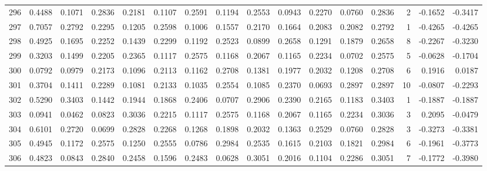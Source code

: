 \begin{tabular}{lrrrrrrrrrrrrrrr}
296 &      0.4488 &  0.1071 &  0.2836 &  0.2181 &  0.1107 &  0.2591 &  0.1194 &  0.2553 &  0.0943 &  0.2270 &   0.0760 &     0.2836 &      2 &                   -0.1652 &                    -0.3417 \\
297 &      0.7057 &  0.2792 &  0.2295 &  0.1205 &  0.2598 &  0.1006 &  0.1557 &  0.2170 &  0.1664 &  0.2083 &   0.2082 &     0.2792 &      1 &                   -0.4265 &                    -0.4265 \\
298 &      0.4925 &  0.1695 &  0.2252 &  0.1439 &  0.2299 &  0.1192 &  0.2523 &  0.0899 &  0.2658 &  0.1291 &   0.1879 &     0.2658 &      8 &                   -0.2267 &                    -0.3230 \\
299 &      0.3203 &  0.1499 &  0.2205 &  0.2365 &  0.1117 &  0.2575 &  0.1168 &  0.2067 &  0.1165 &  0.2234 &   0.0702 &     0.2575 &      5 &                   -0.0628 &                    -0.1704 \\
300 &      0.0792 &  0.0979 &  0.2173 &  0.1096 &  0.2113 &  0.1162 &  0.2708 &  0.1381 &  0.1977 &  0.2032 &   0.1208 &     0.2708 &      6 &                    0.1916 &                     0.0187 \\
301 &      0.3704 &  0.1411 &  0.2289 &  0.1081 &  0.2133 &  0.1035 &  0.2554 &  0.1085 &  0.2370 &  0.0693 &   0.2897 &     0.2897 &     10 &                   -0.0807 &                    -0.2293 \\
302 &      0.5290 &  0.3403 &  0.1442 &  0.1944 &  0.1868 &  0.2406 &  0.0707 &  0.2906 &  0.2390 &  0.2165 &   0.1183 &     0.3403 &      1 &                   -0.1887 &                    -0.1887 \\
303 &      0.0941 &  0.0462 &  0.0823 &  0.3036 &  0.2215 &  0.1117 &  0.2575 &  0.1168 &  0.2067 &  0.1165 &   0.2234 &     0.3036 &      3 &                    0.2095 &                    -0.0479 \\
304 &      0.6101 &  0.2720 &  0.0699 &  0.2828 &  0.2268 &  0.1268 &  0.1898 &  0.2032 &  0.1363 &  0.2529 &   0.0760 &     0.2828 &      3 &                   -0.3273 &                    -0.3381 \\
305 &      0.4945 &  0.1172 &  0.2575 &  0.1250 &  0.2555 &  0.0786 &  0.2984 &  0.2535 &  0.1615 &  0.2103 &   0.1821 &     0.2984 &      6 &                   -0.1961 &                    -0.3773 \\
306 &      0.4823 &  0.0843 &  0.2840 &  0.2458 &  0.1596 &  0.2483 &  0.0628 &  0.3051 &  0.2016 &  0.1104 &   0.2286 &     0.3051 &      7 &                   -0.1772 &                    -0.3980 \\

\end{tabular}
